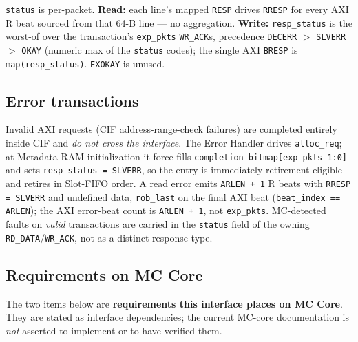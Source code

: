 \noindent \texttt{status} is per-packet.  \textbf{Read:} each line's mapped
\texttt{RESP} drives \texttt{RRESP} for every AXI R beat sourced from that
64-B line --- no aggregation.  \textbf{Write:} \texttt{resp\_status} is the worst-of over
the transaction's \texttt{exp\_pkts} \texttt{WR\_ACK}s, precedence
\texttt{DECERR} $>$ \texttt{SLVERR} $>$ \texttt{OKAY} (numeric max of the
\texttt{status} codes); the single AXI \texttt{BRESP} is
\texttt{map(resp\_status)}.  \texttt{EXOKAY} is unused.

\subsection{Error transactions}

Invalid AXI requests (CIF address-range-check failures) are completed
entirely inside CIF and \emph{do not cross the interface}.  The Error Handler
drives \texttt{alloc\_req}; at Metadata-RAM initialization it force-fills
\texttt{completion\_bitmap[exp\_pkts-1:0]} and sets
\texttt{resp\_status = SLVERR}, so the entry is immediately
retirement-eligible and retires in Slot-FIFO order.  A read error emits
\texttt{ARLEN + 1} R beats with \texttt{RRESP = SLVERR} and undefined data,
\texttt{rob\_last} on the final AXI beat (\texttt{beat\_index == ARLEN}); the
AXI error-beat count is \texttt{ARLEN + 1}, not \texttt{exp\_pkts}.
MC-detected faults on \emph{valid}
transactions are carried in the \texttt{status} field of the owning
\texttt{RD\_DATA}/\texttt{WR\_ACK}, not as a distinct response type.

\subsection{Requirements on MC Core}
\label{sec:cifmc-req}

The two items below are \textbf{requirements this interface places on MC
Core}.  They are stated as interface dependencies; the current MC-core
documentation is \emph{not} asserted to implement or to have verified them.

